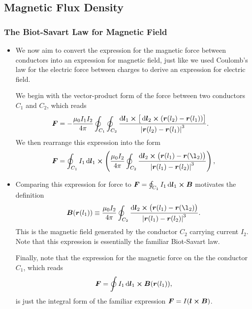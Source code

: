\documentclass[11pt, a4paper]{article}
\newcommand{\diff}{\mathop{}\!\mathrm{d}} %
\renewcommand{\vec}[1]{\bm{#1}} %
\renewcommand{\r}{\vec{r}}
\newcommand{\B}{\vec{B}} %
\newcommand{\mm}{\mu_{0}}  %
\begin{document}
\subsection{Magnetic Flux Density}

\subsubsection{The Biot-Savart Law for Magnetic Field}
\begin{itemize}
	\item We now aim to convert the expression for the magnetic force between conductors into an expression for magnetic field, just like we used Coulomb's law for the electric force between charges to derive an expression for electric field. 
	
	We begin with the vector-product form of the force between two conductors $ C_{1} $ and $ C_{2} $, which reads
	\begin{align*}
		\vec{F} &= - \frac{\mm I_{1}I_{2}}{4\pi}\oint_{C_{1}}\oint_{C_{2}} \frac{\diff \vec{l}_{1}\cross \big[\diff \vec{l}_{2} \cross (\r(l_{2}) - \r(l_{1}) )\big]}{\abs{\r(l_{2}) - \r(l_{1})}^{3}}.
	\end{align*}
    We then rearrange this expression into the form
	\begin{equation*}
		\vec{F} = \oint_{C_{1}}I_{1}\diff \vec{l}_{1}\cross \left(\frac{\mm I_{2}}{4\pi} \oint_{C_{2}}\frac{\diff \vec{l}_{2} \cross \big(\r(l_{1}) - \r(\l_{2})\big)}{\abs{\r(l_{1}) - \r(l_{2})}^{3}}\right),
	\end{equation*}
	
    \item Comparing this expression for force to $ \vec{F} = \oint_{C_{1}} I_{1} \diff \vec{l}_{1} \cross \B $ motivates the definition
	\begin{equation*}
		\B(\r(l_{1})) \equiv \frac{\mm I_{2}}{4\pi} \oint_{C_{2}}\frac{\diff \vec{l}_{2} \cross \big(\r(l_{1}) - \r(\l_{2})\big)}{\abs{\r(l_{1}) - \r(l_{2})}^{3}}.
	\end{equation*}
	This is the magnetic field generated by the conductor $ C_{2} $ carrying current $ I_{2} $. Note that this expression is essentially the familiar Biot-Savart law. 

    Finally, note that the expression for the magnetic force on the the conductor $ C_{1} $, which reads
	\begin{equation*}
		\vec{F} = \oint I_{1}\diff \vec{l}_{1} \cross \B(\r(l_{1})),
	\end{equation*}
	is just the integral form of the familiar expression $ \vec{F} = I (\vec{l}\cross \vec{B}) $. 
	

\end{itemize}
\end{document}

